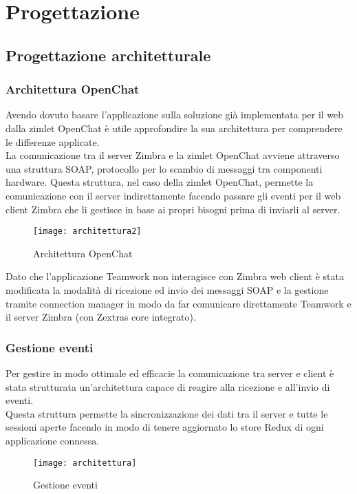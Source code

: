 \chapter{Progettazione}\label{chap:design}

\section {Progettazione architetturale}
\subsection{Architettura OpenChat}
Avendo dovuto basare l'applicazione sulla soluzione già implementata per il web dalla zimlet OpenChat è utile approfondire la sua architettura per comprendere le differenze applicate. \\
La comunicazione tra il server Zimbra e la zimlet OpenChat avviene attraverso una struttura SOAP, protocollo per lo scambio di messaggi tra componenti hardware.
Questa struttura, nel caso della zimlet OpenChat, permette la comunicazione con il server indirettamente facendo passare gli eventi per il web client Zimbra che li gestisce in base ai propri bisogni prima di inviarli al server. \\
\begin{figure}[H] 
	\centering
	\texttt{[image: architettura2]}
	\caption{Architettura OpenChat}
\end{figure}
Dato che l'applicazione Teamwork non interagisce con Zimbra web client è stata modificata la modalità di ricezione ed invio dei messaggi SOAP e la gestione tramite connection manager in modo da far comunicare direttamente Teamwork e il server Zimbra (con Zextras core integrato).

\subsection{Gestione eventi}
Per gestire in modo ottimale ed efficacie la comunicazione tra server e client è stata strutturata un'architettura capace di reagire alla ricezione e all'invio di eventi. \\
Questa struttura permette la sincronizzazione dei dati tra il server e tutte le sessioni aperte facendo in modo di tenere aggiornato lo store Redux di ogni applicazione connessa.

\begin{figure}[H] 
	\centering
	\texttt{[image: architettura]}
	\caption{Gestione eventi}
\end{figure}
